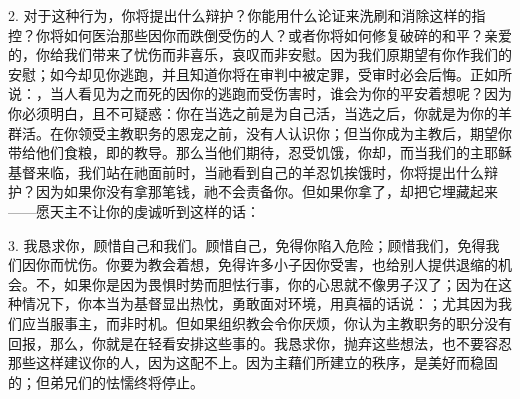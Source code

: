 2. 对于这种行为，你将提出什么辩护？你能用什么论证来洗刷和消除这样的指控？你将如何医治那些因你而跌倒受伤的人？或者你将如何修复破碎的和平？亲爱的，你给我们带来了忧伤而非喜乐，哀叹而非安慰。因为我们原期望有你作我们的安慰；如今却见你逃跑，并且知道你将在审判中被定罪，受审时必会后悔。正如所说：，当人看见为之而死的因你的逃跑而受伤害时，谁会为你的平安着想呢？因为你必须明白，且不可疑惑：你在当选之前是为自己活，当选之后，你就是为你的羊群活。在你领受主教职务的恩宠之前，没有人认识你；但当你成为主教后，期望你带给他们食粮，即的教导。那么当他们期待，忍受饥饿，你却，而当我们的主耶稣基督来临，我们站在祂面前时，当祂看到自己的羊忍饥挨饿时，你将提出什么辩护？因为如果你没有拿那笔钱，祂不会责备你。但如果你拿了，却把它埋藏起来——愿天主不让你的虔诚听到这样的话：\par

3. 我恳求你，顾惜自己和我们。顾惜自己，免得你陷入危险；顾惜我们，免得我们因你而忧伤。你要为教会着想，免得许多小子因你受害，也给别人提供退缩的机会。不，如果你是因为畏惧时势而胆怯行事，你的心思就不像男子汉了；因为在这种情况下，你本当为基督显出热忱，勇敢面对环境，用真福的话说：；尤其因为我们应当服事主，而非时机。但如果组织教会令你厌烦，你认为主教职务的职分没有回报，那么，你就是在轻看安排这些事的。我恳求你，抛弃这些想法，也不要容忍那些这样建议你的人，因为这配不上。因为主藉们所建立的秩序，是美好而稳固的；但弟兄们的怯懦终将停止。\par


